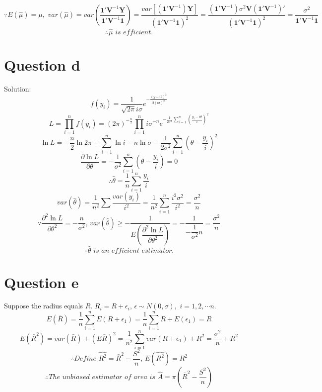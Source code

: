 \documentclass[a4papers]{ctexart}
\begin{document}
\[\because E\left( \hat {\mu }\right) =\mu,\,\,
var\left( \hat {\mu }\right) 
=var\left( \dfrac {\boldsymbol{1}'\boldsymbol{V}^{-1}\boldsymbol{Y}}{\boldsymbol{1}'\boldsymbol{V}^{-1}\boldsymbol{1}}\right) 
=\dfrac {var\left[ \left( \boldsymbol{1}'\boldsymbol{V}^{-1}\right) \boldsymbol{Y}\right] }{\left( \boldsymbol{1}'\boldsymbol{V}^{-1}\boldsymbol{1}\right) ^{2}}
=\dfrac {\left( \boldsymbol{1}'\boldsymbol{V}^{-1}\right) \sigma ^{2}\boldsymbol{V}\left( \boldsymbol{1}'\boldsymbol{V}^{-1}\right)'}{\left( \boldsymbol{1}'\boldsymbol{V}^{-1}\boldsymbol{1}\right) ^{2}}
=\dfrac {\sigma ^{2}}{\boldsymbol{1}'\boldsymbol{V}^{-1}\boldsymbol{1}}
\]
\[\therefore \hat{\mu}\,\,is\,\,efficient.\]

\section*{Question d}
\noindent Solution:
\[ f\left( y_{i}\right) =\dfrac {1}{\sqrt {2\pi }i\sigma }e^{-\frac {\left( y-i\theta \right) ^{2}}{2\left( i\sigma \right) ^{2}}}\]
\[ L=\prod ^{n}_{i=1}f\left( y_{i}\right) =\left( 2\pi \right) ^{-\frac {n}{2}}\prod ^{n}_{i=1}i\sigma ^{-n}e^{-\frac {1}{2\sigma^2}\sum ^{n}_{i=1}\left( \frac {y_{i}-i\theta }{i}\right) ^{2}}\]
\[ \ln L=-\dfrac {n}{2}\ln 2\pi +\sum ^{n}_{i=1}\ln i-n\ln \sigma -\dfrac {1}{2\sigma ^{2}}\sum ^{n}_{i=1}\left( \theta -\dfrac {y_{i}}{i}\right) ^{2} \]
\[ \dfrac {\partial \ln L}{\partial \theta }=-\dfrac {1}{\sigma ^{2}}\sum ^{n}_{i=1}\left( \theta -\dfrac {y_{i}}{i}\right) =0\]
\[\therefore \hat {\theta }=\dfrac {1}{n}\sum ^{n}_{i=1}\dfrac {y_{i}}{i}\]
\[ var\left( \hat {\theta }\right) =\dfrac {1}{n^{2}}\sum \dfrac {var\left( y_{i}\right) }{i^{2}}=\dfrac {1}{n^{2}}\sum ^{n}_{i=1}\dfrac {i^{2}\sigma ^{2}}{i^{2}}=\dfrac{\sigma ^{2}}{n} \]
\[ \because \dfrac {\partial ^{2}\ln L}{\partial \theta ^{2}}=-\dfrac {n}{\sigma ^{2}},\, var\left( \hat {\theta }\right) \geq -\dfrac {1}{E\left( \dfrac {\partial ^{2}\ln L}{\partial \theta ^{2}}\right) }=-\dfrac{1}{-\dfrac{1}{\sigma^2}n}=\dfrac {\sigma ^{2}}{n}\]
\[ \therefore \hat{\theta}\,\, is\,\, an\,\, efficient\,\, estimator.\]


\section*{Question e}
Suppose the radius equals $R$.\,\,$R_i = R+\epsilon_i,\,\epsilon\sim N(0,\sigma),\,\, i=1,2,\cdots n.$
\[ E(\bar{R}) =\dfrac{1}{n}\sum_{i=1}^n E(R+\epsilon_1) = \dfrac{1}{n}\sum_{i=1}^n R+E(\epsilon_1) = R\]
\[ E(\bar{R}^2) = var(\bar{R})+(E\bar{R})^2 = \dfrac{1}{n^2}\sum_{i=1}^n var(R+\epsilon_1) + R^2 =\dfrac{\sigma^2}{n}+R^2\] 
\[ \therefore Define\,\,\hat{R^2} = \bar{R}^2-\dfrac{S^2}{n},\,E(\hat{R^2})=R^2 \]
\[\therefore The \,\, unbiased \,\, estimator\,\,  of\,\,  area\,\,  is \,\, \hat{A} = \pi\left(\bar{R}^2-\dfrac{S^2}{n}\right)\]
\end{document}
